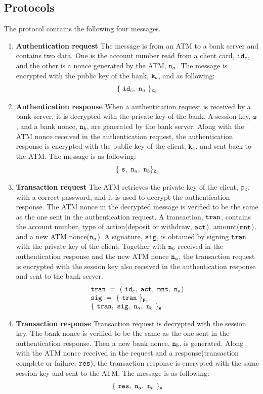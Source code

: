 \documentclass{report}
\newcommand{\co}[1]{$\cod{#1}$}
\begin{document}
\subsection{Protocols}
The protocol contains the following four messages.
\begin{enumerate}
\item \textbf{Authentication request} The message is from an ATM to a bank server and contains two data.
      One is the account number read from a client card, $\mathtt{id}_c$, and the other is a nonce generated by the ATM,
      $\mathtt{n}_a$. The message is encrypted with the public key of the bank, $\mathtt{k}_b$, and as following:
      \[
         \{~\mathtt{id}_c,~\mathtt{n}_a~\}_{\mathtt{k}_b}
      \]
\item \textbf{Authentication response} When a authentication request is received by a bank 
      server, it is decrypted with the private key of the bank. A session key, \co{s}, and a bank nonce, 
      $\mathtt{n}_b$, are generated by the bank server. Along with the ATM nonce received in the authentication
      request, the authentication response is encrypted with the public key of the client, $\mathtt{k}_c$,
      and sent back to the ATM. The message is as following:
      \[
         \{~\mathtt{s},~\mathtt{n}_a,~\mathtt{n}_b\}_{\mathtt{k}_c}
      \]
\item \textbf{Transaction request} The ATM retrieves the private key of the client, $\mathtt{p}_c$, with a correct 
      password, and it is used to decrypt the authentication response. The ATM nonce in the decrypted
      message is verified to be the same as the one sent in the authentication request. 
      A transaction, \co{tran}, contains the account number, type of action(deposit or withdraw, \co{act}),
      amount(\co{mnt}), and a new ATM nonce($\mathtt{n}_a$). A signature, \co{sig}, is obtained by signing 
      \co{tran} with the private key of the client. Together with $\mathtt{n}_b$ received in the authentication
      response and the new ATM nonce $\mathtt{n}_a$, the transaction request is encrypted with the session key 
      also received in the authentication
      response and sent to the bank server. 
      \[
        \begin{array}{l}
          \mathtt{tran}~=~(~\mathtt{id}_c,~\mathtt{act},~\mathtt{mnt},~\mathtt{n}_a) \\
          \mathtt{sig}~=~\{~\mathtt{tran}~\}_{\mathtt{p}_c} \\
          \{~\mathtt{tran},~\mathtt{sig},~\mathtt{n}_a,~\mathtt{n}_b~\}_{\mathtt{s}} \\
        \end{array}
      \]
\item \textbf{Transaction response} Transaction request is decrypted with the session key. The bank nonce
      is verified to be the same as the one sent in the authentication response. Then a new bank nonce,
      $\mathtt{n}_b$, is generated. Along with the ATM nonce received in the request and a response(transaction
      complete or failure, \co{res}), the transaction response is encrypted with the same session key and
      sent to the ATM.
      The message is as following:
      \[
         \{~\mathtt{res},~\mathtt{n}_a,~\mathtt{n}_b~\}_{\mathtt{s}} \\
      \]
\end{enumerate}
\end{document}
